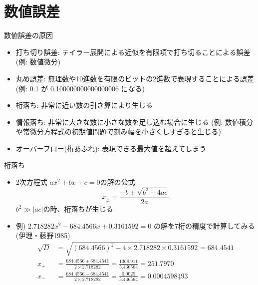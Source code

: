 \section{数値誤差}

\begin{frame}[t,fragile]{数値誤差の原因}
  \begin{itemize}
    \setlength{\itemsep}{1em}
  \item 打ち切り誤差: テイラー展開による近似を有限項で打ち切ることによる誤差
    (例: 数値微分)
  \item 丸め誤差: 無理数や10進数を有限のビットの2進数で表現することによる誤差
    (例: 0.1 が 0.100000000000000006 になる)
  \item 桁落ち: 非常に近い数の引き算により生じる
  \item 情報落ち: 非常に大きな数に小さな数を足し込む場合に生じる
    (例: 数値積分や常微分方程式の初期値問題で刻み幅を小さくしすぎると生じる)
  \item オーバーフロー(桁あふれ): 表現できる最大値を超えてしまう
  \end{itemize}
\end{frame}

\begin{frame}[t,fragile]{桁落ち}
  \begin{itemize}
    \setlength{\itemsep}{1em}
  \item 2次方程式 $ax^2+bx+c=0$の解の公式
    \[
    x_{\pm} = \frac{-b \pm \sqrt{b^2-4ac}}{2a}
    \]
    $b^2 \gg |ac|$の時、桁落ちが生じる
  \item 例) $2.718282x^2 - 684.4566x+0.3161592=0$ の解を7桁の精度で計算してみる(伊理・藤野1985)
    \begin{align*}
      \sqrt{D} &= \sqrt{(684.4566)^2 - 4 \times 2.718282 \times 0.3161592} = 684.4541 \\
      x_+ &= \frac{684.4566+684.4541}{2 \times 2.718282} = \frac{1368.911}{5.436564} = 251.7970 \\
      x_- &= \frac{684.4566-684.4541}{2 \times 2.718282} = \frac{0.0025}{5.436564} = 0.00045\underline{98493}
    \end{align*}
  \end{itemize}
\end{frame}

